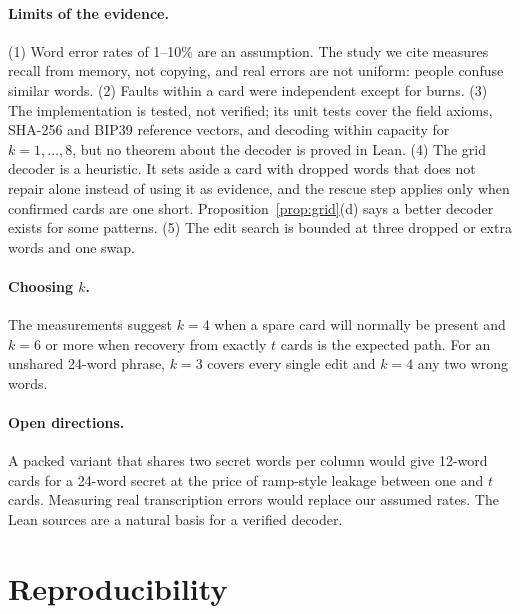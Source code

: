 \documentclass[numeric]{anvil-paper}
\begin{document}
\paragraph{Limits of the evidence.}
(1) Word error rates of 1--10\% are an assumption. The study we cite measures
recall from memory, not copying, and real errors are not uniform: people
confuse similar words. (2) Faults within a card were independent except for
burns. (3) The implementation is tested, not verified; its unit tests cover
the field axioms, SHA-256 and BIP39 reference vectors, and decoding within
capacity for $k=1,\dots,8$, but no theorem about the decoder is proved in
Lean. (4) The grid decoder is a heuristic. It sets aside a card with dropped
words that does not repair alone instead of using it as evidence, and the
rescue step applies only when confirmed cards are one short.
Proposition~\ref{prop:grid}(d) says a better decoder exists for some
patterns. (5) The edit search is bounded at three dropped or extra words and
one swap.

\paragraph{Choosing $k$.}
The measurements suggest $k=4$ when a spare card will normally be present and
$k=6$ or more when recovery from exactly $t$ cards is the expected path. For an
unshared 24-word phrase, $k=3$ covers every single edit and $k=4$ any two wrong
words.

\paragraph{Open directions.}
A packed variant that shares two secret words per column would give 12-word
cards for a 24-word secret at the price of ramp-style leakage between one and
$t$ cards. Measuring real transcription errors would replace our assumed rates.
The Lean sources are a natural basis for a verified decoder.

\section{Reproducibility}
\label{sec:repro}
\end{document}
